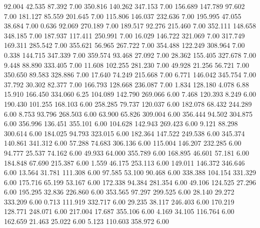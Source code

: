   92.004   42.535   87.392         7.00
 350.816  140.262  347.153         7.00
 156.689  147.789   97.602         7.00
 181.127   85.559  201.645         7.00
 115.806  146.037  232.636         7.00
 195.995   47.055   38.684         7.00
   0.636   92.069  270.189         7.00
 189.517   92.276  215.460         7.00
 352.111  148.658  348.185         7.00
 187.937  117.411  250.991         7.00
  16.029  146.722  321.069         7.00
 317.749  169.311  285.542         7.00
 355.621   56.965  267.722         7.00
 354.488  122.249  308.964         7.00
   0.338  144.715  347.339         7.00
 359.574   93.468   27.092         7.00
  28.362  155.405  327.678         7.00
   9.448   88.890  333.405         7.00
  11.608  102.255  281.230         7.00
  49.928   21.256   56.721         7.00
 350.650   89.583  328.886         7.00
  17.640   74.249  215.668         7.00
   6.771  146.042  345.754         7.00
  37.792   30.302   82.377         7.00
 166.793  128.668  236.087         7.00
   1.834  128.180    4.078         6.88
  15.910  166.450  334.060         6.25
 104.089  142.790  269.066         6.00
   7.468  120.393    8.249         6.00
 190.430  101.255  168.103         6.00
 258.285   79.737  120.037         6.00
 182.078   68.432  244.289         6.00
   8.753   93.796  268.503         6.00
  63.900   65.826  309.004         6.00
 356.444   94.502  304.875         6.00
 356.996  136.451  355.101         6.00
 104.628  142.943  269.423         6.00
   9.121   88.298  300.614         6.00
 184.025   94.793  323.015         6.00
 182.364  147.522  249.538         6.00
 345.374  140.861  341.312         6.00
  57.288   74.683  306.136         6.00
 115.004  146.207  232.285         6.00
  94.777   25.537   74.162         6.00
  49.933   64.000  355.789         6.00
 168.895   46.601   57.181         6.00
 184.848   67.690  215.387         6.00
   1.559   46.175  253.113         6.00
 149.011  146.372  346.646         6.00
  13.564   31.781  111.308         6.00
  97.585   53.100   90.468         6.00
 338.388  104.154  331.329         6.00
 175.716   65.199   53.167         6.00
 172.338   94.384  281.354         6.00
  49.106  124.525   27.296         6.00
 195.295   32.836  226.860         6.00
 353.565   97.297  299.525         6.00
  28.140   29.272  333.209         6.00
   0.713  111.919  332.717         6.00
  29.235   38.117  246.403         6.00
 170.219  128.771  248.071         6.00
 217.004   17.687  355.106         6.00
   4.169   34.105  116.764         6.00
 162.659   21.463   25.022         6.00
   5.123  110.603  358.972         6.00
